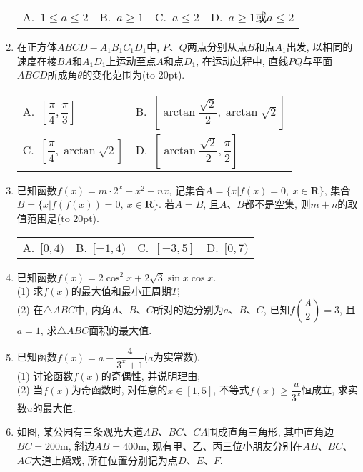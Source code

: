 \documentclass[10pt,a4paper]{article}
\newcommand{\bracket}[1]{(\hbox to #1pt{})}
\newcommand{\twoch}[4]{\par\begin{tabular}{p{.46\textwidth}p{.46\textwidth}}
A.~#1& B.~#2\\
C.~#3& D.~#4
\end{tabular}}
\newcommand{\fourch}[4]{\par\begin{tabular}{p{.23\textwidth}p{.23\textwidth}p{.23\textwidth}p{.23\textwidth}}
A.~#1 &B.~#2& C.~#3& D.~#4
\end{tabular}}
\begin{document}
\begin{enumerate}[1.]
\fourch{$1\le a\le 2$}{$a\ge 1$}{$a\le 2$}{$a\ge 1$或$a\le 2$}
\item 在正方体$ABCD-A_1B_1C_1D_1$中, $P$、$Q$两点分别从点$B$和点$A_1$出发, 以相同的速度在棱$BA$和$A_1D_1$上运动至点$A$和点$D_1$, 在运动过程中, 直线$PQ$与平面$ABCD$所成角$\theta$的变化范围为\bracket{20}.
\begin{center}
\end{center}
\twoch{$[\dfrac\pi4,\dfrac\pi3]$}{$[\arctan\dfrac{\sqrt{2}}2,\arctan\sqrt 2]$}{$[\dfrac\pi4,\arctan\sqrt 2]$}{$[\arctan\dfrac{\sqrt{2}}2,\dfrac\pi2]$}
\item 已知函数$f(x)=m\cdot 2^x+x^2+nx$, 记集合$A=\{x|f(x)=0, \ x\in \mathbf{R}\}$, 集合$B=\{x|f(f(x))=0, \ x\in \mathbf{R}\}$.
若$A=B$, 且$A$、$B$都不是空集, 则$m+n$的取值范围是\bracket{20}.
\fourch{$[0,4)$}{$[-1,4)$}{$[-3,5]$}{$[0,7)$}
\item 已知函数$f(x)=2\cos^2 x+2\sqrt{3}\sin x\cos x$.\\
(1) 求$f(x)$的最大值和最小正周期$T$;\\
(2) 在$\triangle ABC$中, 内角$A$、$B$、$C$所对的边分别为$a$、$B$、$C$, 已知$f(\dfrac A2)=3$, 且$a=1$, 求$\triangle ABC$面积的最大值.
\item 已知函数$f(x)=a-\dfrac 4{3^x+1}$($a$为实常数).\\
(1) 讨论函数$f(x)$的奇偶性, 并说明理由;\\ 
(2) 当$f(x)$为奇函数时, 对任意的$x\in [1,5]$, 不等式$f(x)\ge \dfrac u{3^x}$恒成立, 求实数$u$的最大值.
\item 如图, 某公园有三条观光大道$AB$、$BC$、$CA$围成直角三角形, 其中直角边$BC=200\text{m}$, 斜边$AB=400\text{m}$, 现有甲、乙、丙三位小朋友分别在$AB$、$BC$、$AC$大道上嬉戏, 所在位置分别记为点$D$、$E$、$F$.\\
\begin{center}

\end{center}
\end{enumerate}
\end{document}

